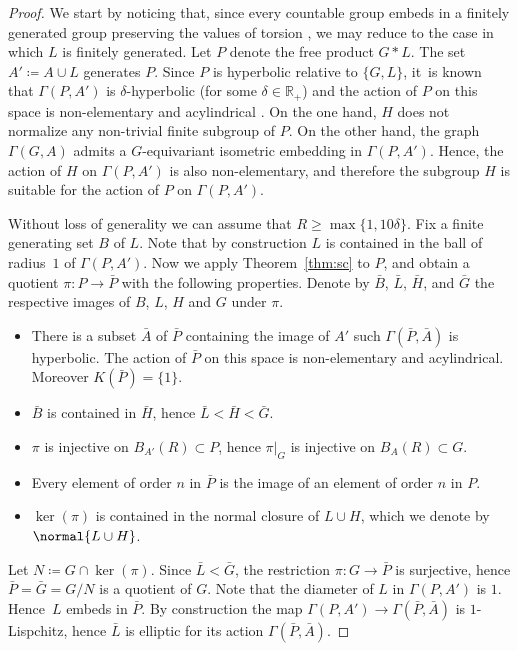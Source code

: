 \begin{proof}
We start by noticing that, since every countable group embeds in a finitely generated group preserving the values of torsion \cite[Th.\,IV.3.1]{Lyndon:2001wm}, we may reduce to the case in which $L$ is finitely generated.
Let $P$ denote the free product $G \ast L$.
The set $A' \coloneqq A \cup L$ generates $P$.
Since $P$ is hyperbolic relative to $\{G,L\}$, it~is known that $\Gamma(P,A')$ is $\delta$-hyperbolic (for some $\delta \in \mathbb R_+$) and the action of $P$ on this space is non-elementary and acylindrical \cite[Th.\,2.7]{Abbott:2019aa}.
On the one hand, $H$ does not normalize any non-trivial finite subgroup of $P$.
On the other hand, the graph $\Gamma(G,A)$ admits a $G$-equivariant isometric embedding in $\Gamma(P,A')$.
Hence, the action of $H$ on $\Gamma(P, A')$ is also non-elementary, and therefore the subgroup $H$ is suitable for the action of $P$ on $\Gamma(P,A')$. 

Without loss of generality we can assume that $R \geq \max\{ 1, 10\delta\}$.
Fix a finite generating set $B$ of $L$.
Note that by construction $L$ is contained in the ball of radius~$1$ of $\Gamma(P, A')$.
Now we apply Theorem~\ref{thm:sc} to $P$, and obtain a quotient $\pi : P \to \bar{P}$ with the following properties.
Denote by $\bar B$, $\bar L$, $\bar H$, and $\bar G$ the respective images of $B$, $L$, $H$ and $G$ under $\pi$.
\begin{itemize}
\item There is a subset $\bar A$ of $\bar P$ containing the image of $A'$ such $\Gamma(\bar P, \bar A)$ is hyperbolic.
The action of $\bar P$ on this space is non-elementary and acylindrical.
Moreover \hbox{$K(\bar P) = \{1\}$}.
\item $\bar B$ is contained in $\bar H$, hence $\bar L < \bar H < \bar G$.
\item $\pi$ is injective on $B_{A'}(R) \subset P$, hence $\pi|_G$ is injective on $B_A(R) \subset G$.
\item Every element of order $n$ in $\bar{P}$ is the image of an element of order $n$ in $P$.
\item $\ker(\pi)$ is contained in the normal closure of $L\cup H$, which we denote by $\normal{L\cup H}$.
\end{itemize}
Let $N \coloneqq G \cap \ker(\pi)$.
Since $\bar L < \bar G$, the restriction $\pi : G \to \bar P$ is surjective, hence $\bar P = \bar G = G/N$ is a quotient of $G$.
Note that the diameter of $L$ in $\Gamma(P,A')$ is $1$.
Hence~$L$ embeds in $\bar P$.
By construction the map $\Gamma(P, A') \to \Gamma(\bar P, \bar A)$ is $1$-Lispchitz, hence $\bar L$ is elliptic for its action $\Gamma(\bar P, \bar A)$.


\end{proof}
